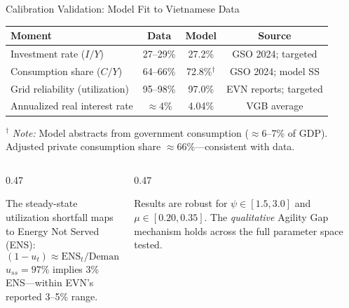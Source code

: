 \documentclass[aspectratio=169,10pt]{beamer}
\begin{document}
\begin{frame}{Calibration Validation: Model Fit to Vietnamese Data}
	\begin{center}
		\renewcommand{\arraystretch}{1.2}
		\begin{tabular}{@{}lccc@{}}
			\toprule
			\textbf{Moment} & \textbf{Data} & \textbf{Model} & \textbf{Source}\\
			\midrule
			Investment rate ($I/Y$)             & 27--29\% & 27.2\% & GSO 2024; targeted\\
			Consumption share ($C/Y$)           & 64--66\% & 72.8\%$^\dagger$ & GSO 2024; model SS\\
			Grid reliability (utilization)      & 95--98\% & 97.0\% & EVN reports; targeted\\
			Annualized real interest rate       & $\approx 4\%$ & 4.04\% & VGB average\\
			\bottomrule
		\end{tabular}
	\end{center}
	\vspace{0.3em}
	{\scriptsize $^\dagger$ \textit{Note:} Model abstracts from government consumption ($\approx6$--7\% of GDP). Adjusted private consumption share $\approx66\%$---consistent with data.}
	\vspace{0.2em}
	\begin{columns}[T]
		\begin{column}{0.47\textwidth}
			\begin{keybox}[title=Reliability Parameter Validation]
				\scriptsize The steady-state utilization shortfall maps to Energy Not Served (ENS):
				\[ (1-u_t)\approx \mathrm{ENS}_t/\mathrm{Demand}_t \]
				$u_{ss}=97\%$ implies 3\% ENS---within EVN's reported 3--5\% range.
			\end{keybox}
		\end{column}
		\begin{column}{0.47\textwidth}
			\begin{goldbox}[title=Sensitivity Check]
				\scriptsize Results are robust for $\psi\in[1.5,3.0]$ and $\mu\in[0.20,0.35]$. The \textit{qualitative} Agility Gap mechanism holds across the full parameter space tested.
			\end{goldbox}
		\end{column}
	\end{columns}
\end{frame}
\end{document}
